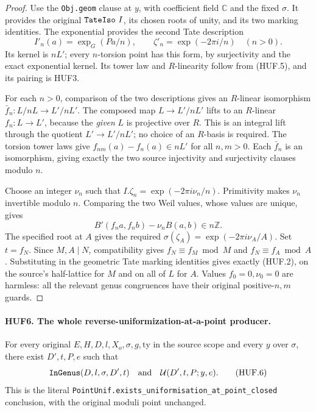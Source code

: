 \documentclass[11pt,a4paper]{article}
\numberwithin{equation}{section}
\theoremstyle{remark}\newtheorem{remark}[theorem]{Remark}
\begin{document}
\begin{proof}
Use the \texttt{Obj.\allowbreak geom} clause at \(y\), with coefficient
field \(\mathbb C\) and the fixed \(\sigma\).  It provides
the original \(\texttt{Tate\allowbreak Iso}\ I\), its chosen roots of
unity, and its two marking identities.
The exponential provides the second Tate description
\[
  I'_n(a)=\exp_G(Pa/n),\qquad
                      \zeta'_n=\exp(-2\pi i/n)\quad(n>0).
\]
Its kernel is \(nL'\); every \(n\)-torsion point has this
form, by surjectivity and the exact exponential kernel.
Its tower law and \(R\)-linearity follow from (HUF.5),
and its pairing is HUF3.

For each \(n>0\), comparison of the two descriptions gives
an \(R\)-linear isomorphism
\(\bar f_n:L/nL\to L'/nL'\).
The composed map \(L\to L'/nL'\) lifts to an
\(R\)-linear \(f_n:L\to L'\), because the \emph{given}
\(L\) is projective over \(R\).  This is an integral
lift through the quotient \(L'\to L'/nL'\); no choice of
an \(R\)-basis is required.  The torsion tower laws give
\(f_{nm}(a)-f_n(a)\in nL'\) for all \(n,m>0\).
Each \(\bar f_n\) is an isomorphism, giving exactly the
two source injectivity and surjectivity clauses modulo \(n\).

Choose an integer \(\nu_n\) such that
\(I.\zeta_n=\exp(-2\pi i\nu_n/n)\).  Primitivity makes
\(\nu_n\) invertible modulo \(n\).
Comparing the two Weil values, whose values are unique,
gives
\[
           B'(f_na,f_nb)-\nu_nB(a,b)\in n\mathbb Z.
\]
The specified root at \(A\) gives the required
\(\sigma(\zeta_A)=\exp(-2\pi i\nu_A/A)\).
Set \(t=f_N\).  Since \(M,A\mid N\), compatibility
gives \(f_N\equiv f_M\bmod M\) and
\(f_N\equiv f_A\bmod A\).  Substituting in the geometric
Tate marking identities gives exactly (HUF.2), on the
source's half-lattice for \(M\) and on all of \(L\)
for \(A\).  Values \(f_0=0,\nu_0=0\) are harmless:
all the relevant genus congruences have their original
positive-\(n,m\) guards.
\end{proof}

\paragraph{HUF6. The whole reverse-uniformization-at-a-point producer.}
\label{claim:HUF6}
For every original \(E,H,D,l,X_o,\sigma,g,\mathrm{ty}\)
in the source scope and every \(y\) over \(\sigma\),
there exist \(D',t,P,e\) such that
\[
 \texttt{In\allowbreak Genus}(D,l,\sigma,D',t)
                 \quad\hbox{and}\quad \mathcal U(D',t,P;y,e).
 \tag{HUF.6}
\]
This is the literal
\texttt{Point\allowbreak Unif.\allowbreak exists\_\allowbreak uniformisation\_\allowbreak at\_\allowbreak point\_\allowbreak closed}
conclusion, with the original moduli point unchanged.
\end{document}
